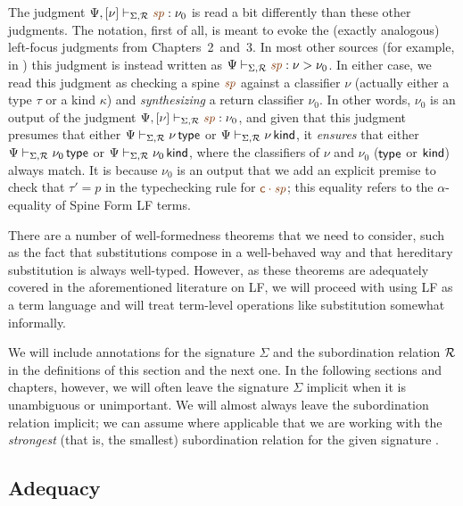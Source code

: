 The judgment $\Psi, [\nu] \vdash_{\Sigma,\subord} \lf\spi : \nu_0$ is
read a bit differently than these other judgments. The notation, first
of all, is meant to evoke the (exactly analogous) left-focus judgments
from Chapters~2~and~3. In most other sources (for example, in
\cite{cervesato02linear}) this judgment is instead written as $\Psi
\vdash_{\Sigma,\subord} \lf\spi : \nu > \nu_0$. In either case, we
read this judgment as checking a spine $\lf\spi$ against a classifier
$\nu$ (actually either a type $\tau$ or a kind $\kappa$) and {\it
  synthesizing} a return classifier $\nu_0$. In other words, $\nu_0$
is an output of the judgment $\Psi, [\nu] \vdash_{\Sigma,\subord}
\lf\spi : \nu_0$, and given that this judgment presumes that either
$\Psi \vdash_{\Sigma,\mathcal R} \nu\,{\sf type}$ or $\Psi
\vdash_{\Sigma,\mathcal R} \nu\,{\sf kind}$, it {\it ensures} that either
$\Psi \vdash_{\Sigma,\mathcal R} \nu_0\,{\sf type}$ or $\Psi
\vdash_{\Sigma,\mathcal R} \nu_0\,{\sf kind}$, where the classifiers of
$\nu$ and $\nu_0$ (${\sf type}$ or ${\sf kind}$) always match.  It is
because $\nu_0$ is an output that we add an explicit premise to check
that $\tau' = p$ in the typechecking rule for $\lf{\lfroot{\sf
    c}{\spi}}$; this equality refers to the $\alpha$-equality of Spine
Form LF terms.

There are a number of well-formedness theorems that we need to
consider, such as the fact that substitutions compose in a
well-behaved way and that hereditary substitution is always
well-typed.  However, as these theorems are adequately covered in the
aforementioned literature on LF, we will proceed with using LF as a
term language and will treat term-level operations like substitution
somewhat informally.

We will include annotations for the signature $\Sigma$ and the
subordination relation $\mathcal R$ in the definitions of this section
and the next one. In the following sections and chapters, however, we
will often leave the signature $\Sigma$ implicit when it is
unambiguous or unimportant. We will almost always leave the
subordination relation implicit; we can assume where applicable that
we are working with the {\it strongest} (that is, the smallest)
subordination relation for the given signature
\cite{harper07mechanizing}.

\subsection{Adequacy}
\label{sec:lf-adequacy}

